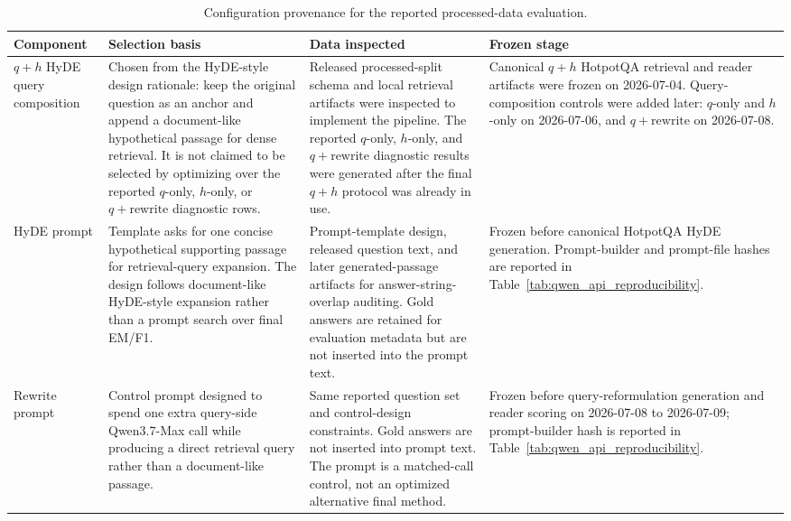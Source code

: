 \begin{table}[t]
\centering
\caption{Configuration provenance for the reported processed-data evaluation.}
\label{tab:configuration_provenance}
\tiny
\begin{threeparttable}
\setlength{\tabcolsep}{2pt}
\renewcommand{\arraystretch}{0.92}
\begin{tabularx}{\textwidth}{>{\raggedright\arraybackslash}p{}
                            >{\raggedright\arraybackslash}p{}
                            >{\raggedright\arraybackslash}p{}
                            >{\raggedright\arraybackslash}X}
\toprule
Component & Selection basis & Data inspected & Frozen stage \\
\midrule
$q+h$ HyDE query composition & Chosen from the HyDE-style design rationale: keep the original question as an anchor and append a document-like hypothetical passage for dense retrieval. It is not claimed to be selected by optimizing over the reported $q$-only, $h$-only, or $q+\mathrm{rewrite}$ diagnostic rows. & Released processed-split schema and local retrieval artifacts were inspected to implement the pipeline. The reported $q$-only, $h$-only, and $q+\mathrm{rewrite}$ diagnostic results were generated after the final $q+h$ protocol was already in use. & Canonical $q+h$ HotpotQA retrieval and reader artifacts were frozen on 2026-07-04. Query-composition controls were added later: $q$-only and $h$-only on 2026-07-06, and $q+\mathrm{rewrite}$ on 2026-07-08. \\
HyDE prompt & Template asks for one concise hypothetical supporting passage for retrieval-query expansion. The design follows document-like HyDE-style expansion rather than a prompt search over final EM/F1. & Prompt-template design, released question text, and later generated-passage artifacts for answer-string-overlap auditing. Gold answers are retained for evaluation metadata but are not inserted into the prompt text. & Frozen before canonical HotpotQA HyDE generation. Prompt-builder and prompt-file hashes are reported in Table~\ref{tab:qwen_api_reproducibility}. \\
Rewrite prompt & Control prompt designed to spend one extra query-side Qwen3.7-Max call while producing a direct retrieval query rather than a document-like passage. & Same reported question set and control-design constraints. Gold answers are not inserted into prompt text. The prompt is a matched-call control, not an optimized alternative final method. & Frozen before query-reformulation generation and reader scoring on 2026-07-08 to 2026-07-09; prompt-builder hash is reported in Table~\ref{tab:qwen_api_reproducibility}. \\

\end{tabularx}
\end{threeparttable}
\end{table}
